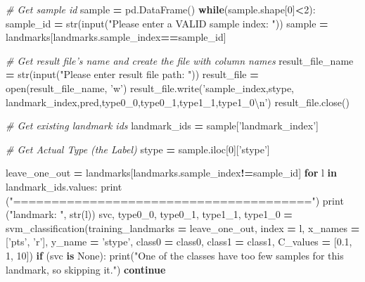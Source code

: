 \documentclass[10pt,letterpaper]{article}
\newenvironment{Shaded}{\begin{snugshade}}{\end{snugshade}}
\newcommand{\KeywordTok}[1]{\textcolor[rgb]{0.13,0.29,0.53}{\textbf{#1}}}
\newcommand{\DecValTok}[1]{\textcolor[rgb]{0.00,0.00,0.81}{#1}}
\newcommand{\FloatTok}[1]{\textcolor[rgb]{0.00,0.00,0.81}{#1}}
\newcommand{\CharTok}[1]{\textcolor[rgb]{0.31,0.60,0.02}{#1}}
\newcommand{\StringTok}[1]{\textcolor[rgb]{0.31,0.60,0.02}{#1}}
\newcommand{\CommentTok}[1]{\textcolor[rgb]{0.56,0.35,0.01}{\textit{#1}}}
\newcommand{\VariableTok}[1]{\textcolor[rgb]{0.00,0.00,0.00}{#1}}
\newcommand{\ControlFlowTok}[1]{\textcolor[rgb]{0.13,0.29,0.53}{\textbf{#1}}}
\newcommand{\OperatorTok}[1]{\textcolor[rgb]{0.81,0.36,0.00}{\textbf{#1}}}
\newcommand{\BuiltInTok}[1]{#1}
\newcommand{\NormalTok}[1]{#1}
\begin{document}
\begin{Shaded}
\begin{Highlighting}[]
    \CommentTok{# Get sample id}
\NormalTok{    sample }\OperatorTok{=}\NormalTok{ pd.DataFrame()}
    \ControlFlowTok{while}\NormalTok{(sample.shape[}\DecValTok{0}\NormalTok{]}\OperatorTok{<}\DecValTok{2}\NormalTok{):}
\NormalTok{        sample_id }\OperatorTok{=} \BuiltInTok{str}\NormalTok{(}\BuiltInTok{input}\NormalTok{(}\StringTok{"Please enter a VALID sample index: "}\NormalTok{))}
\NormalTok{        sample }\OperatorTok{=}\NormalTok{ landmarks[landmarks.sample_index}\OperatorTok{==}\NormalTok{sample_id]}

    \CommentTok{# Get result file's name and create the file with column names}
\NormalTok{    result_file_name }\OperatorTok{=} \BuiltInTok{str}\NormalTok{(}\BuiltInTok{input}\NormalTok{(}\StringTok{"Please enter result file path: "}\NormalTok{))}
\NormalTok{    result_file }\OperatorTok{=} \BuiltInTok{open}\NormalTok{(result_file_name, }\StringTok{'w'}\NormalTok{)}
\NormalTok{    result_file.write(}\StringTok{'sample_index,stype,}
\StringTok{        landmark_index,pred,type0_0,type0_1,type1_1,type1_0}\CharTok{\textbackslash{}n}\StringTok{'}\NormalTok{)}
\NormalTok{    result_file.close()}

    \CommentTok{# Get existing landmark ids}
\NormalTok{    landmark_ids }\OperatorTok{=}\NormalTok{ sample[}\StringTok{'landmark_index'}\NormalTok{]}

    \CommentTok{# Get Actual Type (the Label)}
\NormalTok{    stype }\OperatorTok{=}\NormalTok{ sample.iloc[}\DecValTok{0}\NormalTok{][}\StringTok{'stype'}\NormalTok{]}

\NormalTok{    leave_one_out }\OperatorTok{=}\NormalTok{ landmarks[landmarks.sample_index}\OperatorTok{!=}\NormalTok{sample_id]}
    \ControlFlowTok{for}\NormalTok{ l }\KeywordTok{in}\NormalTok{ landmark_ids.values:}
        \BuiltInTok{print}\NormalTok{ (}\StringTok{"======================================="}\NormalTok{)}
        \BuiltInTok{print}\NormalTok{ (}\StringTok{"landmark: "}\NormalTok{, }\BuiltInTok{str}\NormalTok{(l))}
\NormalTok{        svc, type0_0, type0_1, type1_1, type1_0 }\OperatorTok{=}
\NormalTok{            svm_classification(training_landmarks }\OperatorTok{=}\NormalTok{ leave_one_out,}
\NormalTok{                                                 index }\OperatorTok{=}\NormalTok{ l,}
\NormalTok{                                                 x_names }\OperatorTok{=}\NormalTok{ [}\StringTok{'pts'}\NormalTok{, }\StringTok{'r'}\NormalTok{],}
\NormalTok{                                                 y_name }\OperatorTok{=} \StringTok{'stype'}\NormalTok{,}
\NormalTok{                                                 class0 }\OperatorTok{=}\NormalTok{ class0,}
\NormalTok{                                                 class1 }\OperatorTok{=}\NormalTok{ class1,}
\NormalTok{                                                 C_values }\OperatorTok{=}\NormalTok{ [}\FloatTok{0.1}\NormalTok{, }\DecValTok{1}\NormalTok{, }\DecValTok{10}\NormalTok{])}
        \ControlFlowTok{if}\NormalTok{ (svc }\KeywordTok{is} \VariableTok{None}\NormalTok{):}
            \BuiltInTok{print}\NormalTok{(}\StringTok{"One of the classes have too few samples}
\StringTok{                for this landmark, so skipping it."}\NormalTok{)}
            \ControlFlowTok{continue}


\end{Highlighting}
\end{Shaded}
\end{document}
